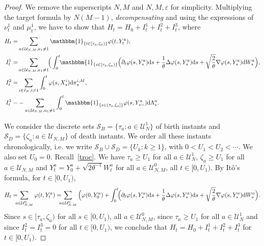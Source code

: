\documentclass[11pt]{article}
\newcommand{\1}{\mathbbm{1}}
\newcommand{\dd}{{\rm d}}
\newcommand{\Ss}{\mathcal S}
\newcommand{\Uu}{\mathcal U}
\newcommand{\e}{\varepsilon}
\newcommand{\sm}{{s-}}
\newcommand{\vip}{\vskip5pt}
\begin{document}
\begin{proof}
We remove the superscripts $N,M$ and $N,M,\e$ for simplicity.
Multiplying the target formula by $N(M-1)$, {\it decompensating} and using the expressions 
of $\nu^1_t$ and $\mu^1_t$, we have to show that $H_t=H_0+I_t^1+I^2_t+I^3_t$, where
\begin{align*}
H_t=&\sum_{a\in \Uu_{N,M},a_1\neq 1} \1_{\{t \in [\tau_a,\zeta_a)\}}\varphi(t,Y^a_t),\\
I^1_t=& \sum_{a\in \Uu_{N,M},a_1\neq 1} \!\!\Big( \int_0^t \!\! \1_{\{s\in [\tau_a,\zeta_a)\}}
\Big(\partial_t\varphi(s,Y^a_s)\dd s+\frac1\theta
\Delta \varphi(s,Y^a_s) \dd s +\sqrt{\frac 2 \theta}\nabla\varphi(s,Y^{a}_s) \dd W^a_s\Big),\\
I^2_t=&\sum_{i\in I_N,i\neq 1}\int_0^t\varphi(s,X^{i}_s) \dd \pi_s^{i,M},\\
I^3_t=&-\sum_{a \in \Uu_{N,M},a_1\neq 1}\int_0^t \1_{\{s\in (\tau_a,\zeta_a]\}}
\varphi(s,Y^{a}_\sm) \dd \Lambda^a_s.
\end{align*}

We consider the discrete sets $\Ss_B=\{\tau_a : a \in \Uu_N^1\}$ of birth instants and
$\Ss_D= \{\zeta_a : a \in \Uu_{N,M}\}$ of death instants. We order all these instants chronologically,
i.e. we write $\Ss_B\cup \Ss_D=\{U_k : k\geq1\}$, with $0<U_1<U_2<\cdots$. We also set $U_0=0$.
\vip
Recall~\eqref{troc}. We have $\tau_a\geq U_1$ for all $a \in \Uu_N^1$, $\zeta_a\geq U_1$ for all 
$a \in \Uu_{N,M}$ and $Y^a_t=Y^a_0+\sqrt{2\theta^{-1}}W^a_t$ 
for all $a \in \Uu_{N,M}^0$, all $t\in [0,U_1)$. By Itô's formula, for
$t \in [0,U_1)$, 
$$
H_t=\!\!\!\!\sum_{a\in \Uu_{N,M}^0}\varphi(t,Y^a_t)=\!\!\!\!\sum_{a\in \Uu_{N,M}^0} \Big(\varphi(0,Y^a_0) 
+ \int_0^t \!\! \Big(\partial_t\varphi(s,Y^a_s)\dd s+\frac1\theta
\Delta \varphi(s,Y^a_s) \dd s+ \sqrt{\frac 2 \theta}
\nabla\varphi(s,Y^{a}_s) \dd W^a_s\Big).
$$
Since $s\in [\tau_a,\zeta_a)$ for all $s\in [0,U_1)$, all $a \in \Uu^0_{N,M}$, since $\tau_a\geq U_1$
for all $a \in \Uu^1_N$ and since $I^2_t=I^3_t=0$ for all $t\in [0,U_1)$,
we conclude that $H_t=H_0+I_t^1+I^2_t+I^3_t$ for $t\in [0,U_1)$.

\vip


\end{proof}
\end{document}
